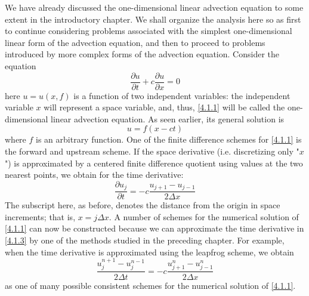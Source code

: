 We have already discussed the one-dimensional linear advection equation to some extent in the introductory chapter. We shall organize the analysis here so as first to continue considering problems associated with the simplest one-dimensional linear form of the advection equation, and then to proceed to problems introduced by more complex forms of the advection equation.
Consider the equation
\begin{equation}\label{4.1.1}
	\frac{\partial u}{\partial t}+c\frac{\partial u}{\partial x}=0
\end{equation}
here $u=u(x,f)$ is a function of two independent variables: the independent variable $x$ will represent a space variable, and, thus, \ref{4.1.1} will be called the one-dimensional linear advection equation. As seen earlier, its general solution is
$$u=f(x-ct)$$ where $f$ is an arbitrary function.
One of the finite difference schemes for \ref{4.1.1} is the forward and upstream scheme. If the space derivative (i.e. discretizing only "$x$") is approximated by a centered finite difference quotient using values at the two nearest points, we obtain for the time derivative:
\begin{equation}\label{4.1.3}
	\frac{\partial u_j}{\partial t}=-c\frac{u_{j+1}-u_{j-1}}{2\Delta x}
\end{equation}
The subscript here, as before, denotes the distance from the origin in space increments; that is, $x=j\Delta x$. A number of schemes for the numerical solution of \ref{4.1.1} can now be constructed because we can approximate the time derivative in \ref{4.1.3} by one of the methods studied in the preceding chapter. For example, when the time derivative is approximated using the leapfrog scheme, we obtain
\begin{equation}\label{4.1.4}
	\frac{u^{n+1}_j-u^{n-1}_j}{2\Delta t}=-c\frac{u_{j+1}^n-u_{j-1}^n}{2\Delta x}
\end{equation}
as one of many possible consistent schemes for the numerical solution of \ref{4.1.1}.

